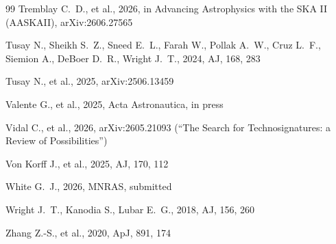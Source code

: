 \documentclass{openjournal}
\begin{document}
\begin{thebibliography}{99}
 Tremblay C.~D., et al., 2026, in Advancing Astrophysics with the SKA II (AASKAII), arXiv:2606.27565

 Tusay N., Sheikh S.~Z., Sneed E.~L., Farah W., Pollak A.~W., Cruz L.~F., Siemion A., DeBoer D.~R., Wright J.~T., 2024, AJ, 168, 283

 Tusay N., et al., 2025, arXiv:2506.13459

 Valente G., et al., 2025, Acta Astronautica, in press

 Vidal C., et al., 2026, arXiv:2605.21093 (``The Search for Technosignatures: a Review of Possibilities'')

 Von Korff J., et al., 2025, AJ, 170, 112

 White G.~J., 2026, MNRAS, submitted

 Wright J.~T., Kanodia S., Lubar E.~G., 2018, AJ, 156, 260

 Zhang Z.-S., et al., 2020, ApJ, 891, 174

\end{thebibliography}
\end{document}

